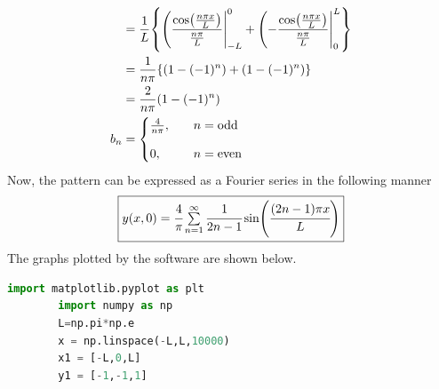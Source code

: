 \documentclass[addpoints]{exam}
\begin{document}
\begin{questions}
\begin{solution}
\begin{align*}
            & = \frac{1}{L} \qty{\eval(\frac{\cos(\frac{n \pi x}{L})}{\frac{n \pi}{L}}|_{-L}^{0} + \eval(-\frac{\cos(\frac{n \pi x}{L})}{\frac{n \pi}{L}}|_{0}^{L}} \\
            & = \frac{1}{n \pi} \qty{\qty(1 - (-1)^n) + \qty(1 - (-1)^n)}                                                                                           \\
            & = \frac{2}{n \pi} \qty(1 - (-1)^n)                                                                                                                    \\
        b_n & = \begin{cases}
                    \frac{4}{n \pi}, \quad & n = \text{odd}  \\[2ex]
                    0,               \quad & n = \text{even}
                \end{cases}
    \end{align*}
    Now, the pattern can be expressed as a Fourier series in the following manner
    \[
        \fbox{$y(x, 0) = \cfrac{4}{\pi} \sum\limits_{n=1}^\infty \cfrac{1}{2n-1} \sin(\cfrac{(2n-1) \pi x}{L})$}
    \]
    The graphs plotted by the software are shown below.
    \begin{lstlisting}[language = python]
        import matplotlib.pyplot as plt
        import numpy as np
        L=np.pi*np.e
        x = np.linspace(-L,L,10000)
        x1 = [-L,0,L]
        y1 = [-1,-1,1]


\end{lstlisting}
\end{solution}
\end{questions}
\end{document}
